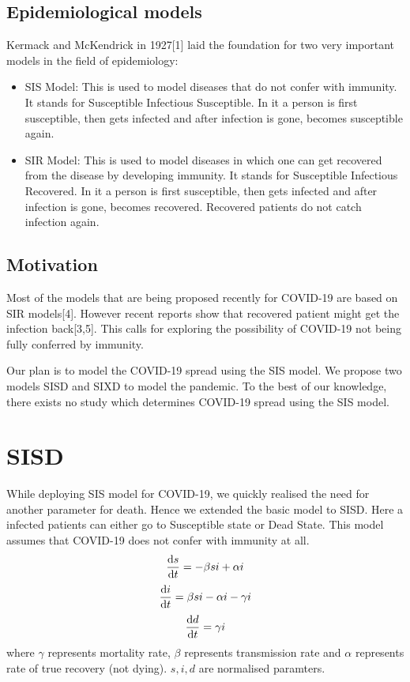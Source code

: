 \documentclass{article}
\begin{document}
	\subsection{Epidemiological models}
	Kermack and McKendrick in 1927[1] laid the foundation for two very important models in the field of epidemiology:
	\begin{itemize}
		\item SIS Model: This is used to model diseases that do not confer with immunity. It stands for Susceptible Infectious Susceptible. In it a person is first susceptible, then gets infected and after infection is gone, becomes susceptible again.
		\item SIR Model: This is used to model diseases in which one can get recovered from the disease by developing immunity. It stands for Susceptible Infectious Recovered. In it a person is first susceptible, then gets infected and after infection is gone, becomes recovered. Recovered patients do not catch infection again.
	\end{itemize}

	\subsection{Motivation}
	Most of the models that are being proposed recently for COVID-19 are based on SIR models[4]. However recent reports show that recovered patient might get the infection back[3,5]. This calls for exploring the possibility of COVID-19 not being fully conferred by immunity. 

	Our plan is to model the COVID-19 spread using the SIS model. We propose two models SISD and SIXD to model the pandemic. To the best of our knowledge, there exists no study which determines COVID-19 spread using the SIS model.

	
	\section{SISD}
	While deploying SIS model for COVID-19, we quickly realised the need for another parameter for death. Hence we extended the basic model to SISD. Here a infected patients can either go to Susceptible state or Dead State. This model assumes that COVID-19 does not confer with immunity at all.
	\begin{equation*}
		\dv{s}{t} = -\beta si + \alpha i
	\end{equation*}
	\begin{equation*}
		\dv{i}{t} = \beta si - \alpha i - \gamma i
	\end{equation*}
	\begin{equation*}
		\dv{d}{t} = \gamma i
	\end{equation*}
	where $\gamma$ represents mortality rate, $\beta$ represents transmission rate and $\alpha$ represents rate of true recovery (not dying). $s, i, d$ are normalised paramters.
\end{document}
